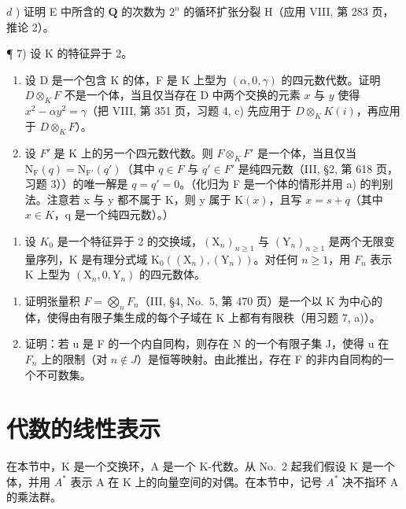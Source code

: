 \(d\) ) 证明 E 中所含的 \(\mathbf{Q}\) 的次数为 \(2^{n}\) 的循环扩张分裂 H（应用 VIII, 第 283 页，推论 2）。

¶ 7) 设 K 的特征异于 2。

\begin{enumerate}
\def\labelenumi{\alph{enumi})}
\item
  设 D 是一个包含 K 的体，F 是 K 上型为 \((\alpha, 0, \gamma)\) 的四元数代数。证明 \(D \otimes_{K} F\) 不是一个体，当且仅当存在 D 中两个交换的元素 \(x\) 与 \(y\) 使得 \(x^2 - \alpha y^2 = \gamma\)（把 VIII, 第 351 页，习题 4, c) 先应用于 \(D \otimes_{K} K(i)\)，再应用于 \(D \otimes_{K} F\)）。
\item
  设 \(F'\) 是 K 上的另一个四元数代数。则 \(F \otimes_{K} F'\) 是一个体，当且仅当 \(\mathrm{N}_{\mathrm{F}}(q) = \mathrm{N}_{\mathrm{F}'}(q')\)（其中 \(q \in F\) 与 \(q' \in F'\) 是纯四元数（III, §2, 第 618 页，习题 3））的唯一解是 \(q = q' = 0\)。（化归为 F 是一个体的情形并用 a) 的判别法。注意若 x 与 y 都不属于 K，则 y 属于 \(\mathrm{K}(x)\)，且写 \(x = s + q\)（其中 \(x \in K\)，q 是一个纯四元数）。）
\end{enumerate}

\begin{enumerate}
\def\labelenumi{\arabic{enumi})}
\setcounter{enumi}{7}
\tightlist
\item
  设 \(K_{0}\) 是一个特征异于 2 的交换域，\((\mathrm{X}_{n})_{n\geqslant1}\) 与 \((\mathrm{Y}_{n})_{n\geqslant1}\) 是两个无限变量序列，K 是有理分式域 \(\mathrm{K}_{0}((\mathrm{X}_{n}),(\mathrm{Y}_{n}))\)。对任何 \(n\geqslant1\)，用 \(F_{n}\) 表示 K 上型为 \((\mathrm{X}_{n},0,\mathrm{Y}_{n})\) 的四元数体。
\end{enumerate}

\begin{enumerate}
\def\labelenumi{\alph{enumi})}
\item
  证明张量积 \(F = \bigotimes_{n} F_{n}\)（III, §4, No.~5, 第 470 页）是一个以 K 为中心的体，使得由有限子集生成的每个子域在 K 上都有有限秩（用习题 7, a)）。
\item
  证明：若 u 是 F 的一个内自同构，则存在 N 的一个有限子集 J，使得 u 在 \(F_{n}\) 上的限制（对 \(n \notin J\)）是恒等映射。由此推出，存在 F 的非内自同构的一个不可数集。
\end{enumerate}

\section{代数的线性表示}

在本节中，K 是一个交换环，A 是一个 K-代数。从 No.~2 起我们假设 K 是一个体，并用 \(A^{*}\) 表示 A 在 K 上的向量空间的对偶。在本节中，记号 \(A^{*}\) 决不指环 A 的乘法群。


